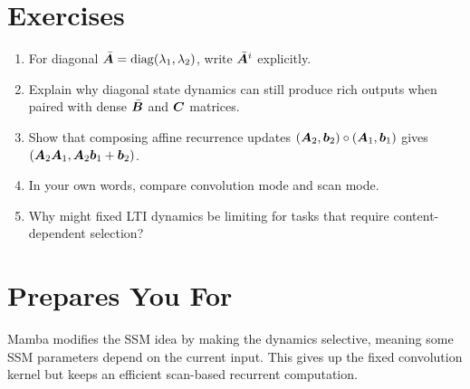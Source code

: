 \section{Exercises}

\begin{enumerate}
  \item For diagonal $\bar{\bm{A}}=\operatorname{diag}(\lambda_1,\lambda_2)$, write
  $\bar{\bm{A}}^i$ explicitly.
  \item Explain why diagonal state dynamics can still produce rich outputs when paired
  with dense $\bar{\bm{B}}$ and $\bm{C}$ matrices.
  \item Show that composing affine recurrence updates
  $(\bm{A}_2,\bm{b}_2)\circ(\bm{A}_1,\bm{b}_1)$ gives
  $(\bm{A}_2\bm{A}_1,\bm{A}_2\bm{b}_1+\bm{b}_2)$.
  \item In your own words, compare convolution mode and scan mode.
  \item Why might fixed LTI dynamics be limiting for tasks that require content-dependent
  selection?
\end{enumerate}

\section{Prepares You For}

Mamba modifies the SSM idea by making the dynamics selective, meaning some SSM parameters
depend on the current input. This gives up the fixed convolution kernel but keeps an
efficient scan-based recurrent computation.
